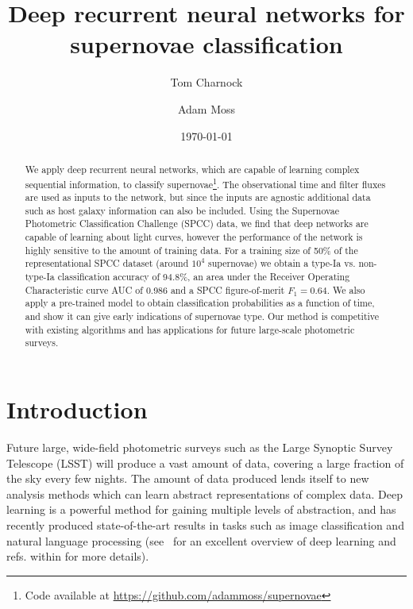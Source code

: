 \documentclass[twocolumn]{aastex61}
\begin{document}
\title{Deep recurrent neural networks for supernovae classification}

\author{Tom Charnock} 

\author{Adam Moss} 

\date{\today}

\begin{abstract}
   We apply deep recurrent neural networks, which are capable of learning complex sequential information, to classify supernovae\footnote{Code available at \href{https://github.com/adammoss/supernovae}{https://github.com/adammoss/supernovae}}. The observational time and  filter fluxes are used as inputs to the network, but since the inputs are agnostic additional data such as host galaxy information can also be included. Using the Supernovae Photometric Classification Challenge (SPCC) data, we find that deep networks are capable of learning about light curves, however the performance of the network is highly sensitive to the amount of training data.  For a training size of 50\% of the representational SPCC dataset (around $10^4$ supernovae) we obtain a type-Ia vs. non-type-Ia classification accuracy of 94.8\%, an area under the Receiver Operating Characteristic curve AUC of 0.986 and a SPCC figure-of-merit $F_1=0.64$. We also apply a pre-trained model to obtain classification probabilities as a function of time, and show it can give early indications of supernovae type. Our method is competitive with existing algorithms and has applications for future large-scale photometric surveys. 
   \end{abstract}


\section{Introduction}

Future large, wide-field photometric surveys such as the Large Synoptic	Survey Telescope (LSST) will produce a vast amount of data, covering a large fraction of the sky every few nights. The amount of data produced lends itself to new analysis methods which can learn abstract representations of complex data. Deep learning is a powerful method for gaining multiple levels of abstraction, and has recently produced state-of-the-art results in tasks such as image classification and natural language processing (see~\cite{0483bd9444a348c8b59d54a190839ec9} for an excellent overview of deep learning and refs. within for more details).
\end{document}
